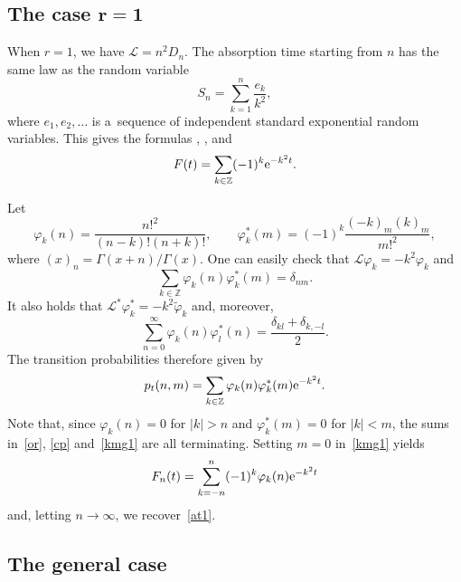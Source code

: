 \documentclass[pdftex]{sigma}
\theoremstyle{definition}
\newcommand\Z{{\mathbb Z}}
\newcommand\cL{{\mathcal L}}
\begin{document}
\subsection[The case r=1]{The case $\boldsymbol{r=1}$}\label{r1}

When $r=1$, we have $\cL=n^2 D_n$. The absorption time starting from $n$ has the same law as the random variable
\begin{equation}\label{sn} S_n=\sum_{k=1}^n \frac{e_k}{k^2},\end{equation}
where $e_1,e_2,\dots$ is a~sequence of independent standard exponential random variables.
This gives the formulas
, ,
and \begin{equation}\label{at1} F(t)=\sum_{k\in\Z} (-1)^k {\rm e}^{-k^2 t}.\end{equation}

Let
\[\varphi_k(n)= \frac{n!^2}{(n-k)!(n+k)!},\qquad \varphi^*_k(m) = (-1)^k \frac{(-k)_m(k)_m}{m!^2},\]
where $(x)_n=\Gamma(x+n)/\Gamma(x)$.
One can easily check that $\cL \varphi_k = -k^2 \varphi_k$ and
\begin{equation}\label{or} \sum_{k\in\Z} \varphi_k(n) \varphi^*_k(m) =\delta_{nm}.\end{equation}
It also holds that $\cL^* \varphi^*_k = -k^2 \tilde\varphi_k$ and, moreover,
\begin{equation}\label{cp} \sum_{n=0}^\infty \varphi_k(n) \varphi^*_l(n) = \frac{\delta_{kl}+\delta_{k,-l}}{2}.\end{equation}
The transition probabilities therefore given by
\begin{equation}\label{kmg1}
p_t(n,m)=\sum_{k\in\Z} \varphi_k(n) \varphi^*_k(m) {\rm e}^{-k^2 t}.
\end{equation}
Note that, since $\varphi_k(n)=0$ for $|k|>n$ and $\varphi^*_k(m) =0$ for $|k|<m$,
the sums in~\eqref{or}, \eqref{cp} and~\eqref{kmg1} are all terminating.
Setting $m=0$ in~\eqref{kmg1} yields
\[F_n(t) = \sum_{k=-n}^n (-1)^k \varphi_k(n) {\rm e}^{-k^2 t}\]
and, letting $n\to\infty$, we recover~\eqref{at1}.

\subsection{The general case}
\end{document}
